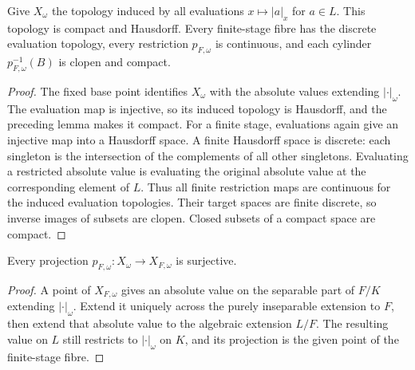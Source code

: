 \begin{lemma}
\label{lem:compact-evaluation-fibre}
\leanok
{}
Give $X_\omega$ the topology induced by all evaluations
$x\mapsto |a|_x$ for $a\in L$. This topology is compact and Hausdorff.
Every finite-stage fibre has the discrete evaluation topology, every
restriction $p_{F,\omega}$ is continuous, and each cylinder
$p_{F,\omega}^{-1}(B)$ is clopen and compact.
\end{lemma}
\begin{proof}
The fixed base point identifies $X_\omega$ with the absolute values
extending $|\cdot|_\omega$. The evaluation map is injective, so its
induced topology is Hausdorff, and the preceding lemma makes it compact.
For a finite stage, evaluations again give an injective map into a
Hausdorff space. A finite Hausdorff space is discrete: each singleton
is the intersection of the complements of all other singletons.
Evaluating a restricted absolute value is evaluating the original
absolute value at the corresponding element of $L$. Thus all finite
restriction maps are continuous for the induced evaluation topologies.
Their target spaces are finite discrete, so inverse images of subsets
are clopen. Closed subsets of a compact space are compact.
\end{proof}

\begin{lemma}\label{lem:finite-fibre-projection-surjective}
\leanok
{}
Every projection $p_{F,\omega}:X_\omega\to X_{F,\omega}$ is surjective.
\end{lemma}
\begin{proof}
A point of $X_{F,\omega}$ gives an absolute value on the separable part
of $F/K$ extending $|\cdot|_\omega$. Extend it uniquely across the
purely inseparable extension to $F$, then extend that absolute value to
the algebraic extension $L/F$. The resulting value on $L$ still
restricts to $|\cdot|_\omega$ on $K$, and its projection is the given
point of the finite-stage fibre.
\end{proof}

